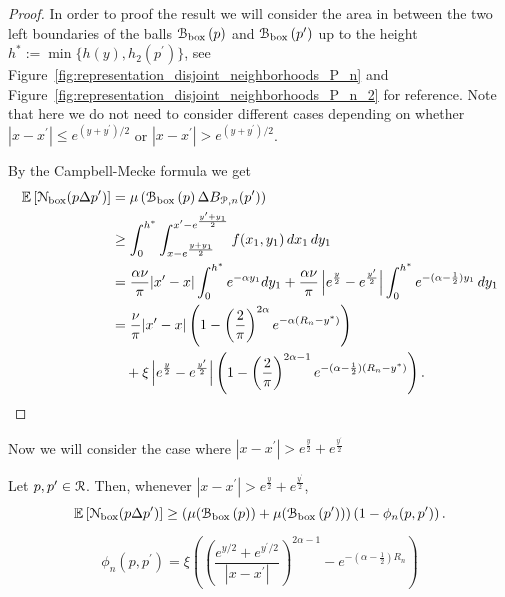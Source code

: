 \begin{proof}
In order to proof the result we will consider the area in between the two left boundaries of the balls ${\mathcal B}_{\text{box}}\left(p\right)$ and
${\mathcal B}_{\text{box}}\left(p^\prime\right)$ up to the height $h^\ast := \min\{h(y), h_2(p^\prime)\}$, see Figure~\ref{fig:representation_disjoint_neighborhoods_P_n} and Figure~\ref{fig:representation_disjoint_neighborhoods_P_n_2} for reference. Note that here we do not need to consider different cases depending on whether $|x - x^\prime| \le e^{(y + y^\prime)/2}$ or $|x - x^\prime| > e^{(y + y^\prime)/2}$. 

By the Campbell-Mecke formula we get
\begin{align*}
	\mathbb{E}\left[{\mathcal N}_{\text{box}}(p \Delta p^\prime)\right] &=	\mu\left({\mathcal B}_{\text{box}}\left(p\right) \Delta B_{{\mathcal P},n}(p^\prime)\right)\\
	&\ge \int_0^{h^\ast} \int_{x - e^{\frac{y + y_1}{2}}}^{x^\prime - e^{\frac{y^\prime + y_1}{2}}} f(x_1,y_1)
		\, dx_1 \, dy_1 \\
	&= \frac{\alpha \nu}{\pi}|x^\prime - x| \int_{0}^{h^\ast} e^{-\alpha y_1} dy_1
		+ \frac{\alpha \nu}{\pi}\left|e^{\frac{y}{2}} - e^{\frac{y^\prime}{2}}\right| \int_0^{h^\ast} 
		e^{-(\alpha-\frac{1}{2})y_1} \, dy_1\\
	&= \frac{\nu}{\pi}|x^\prime - x|\left(1 - \left(\frac{2}{\pi}\right)^{2\alpha}e^{-\alpha(R_n - y^\ast)}\right)\\
	&\hspace{10pt}+ \xi\left|e^{\frac{y}{2}} - e^{\frac{y^\prime}{2}}\right|
		\left(1 - \left(\frac{2}{\pi}\right)^{2\alpha - 1}e^{-(\alpha - \frac{1}{2})(R_n-y^\ast)}\right).
\end{align*}
\end{proof}

Now we will consider the case where $|x - x^\prime| > e^{\frac{y}{2}} + e^{\frac{y^\prime}{2}}$

\begin{lemma}\label{lem:disjoint_neighbors_P_n_large}
Let $p, p^\prime \in {\mathcal R}$. Then, whenever $|x - x^\prime| > e^{\frac{y}{2}} + e^{\frac{y^\prime}{2}}$,
\[
	\mathbb{E}\left[{\mathcal N}_{\text{box}}(p\Delta p^\prime)\right]
	\ge \left(\mu({\mathcal B}_{\text{box}}\left(p\right)) + \mu({\mathcal B}_{\text{box}}\left(p^\prime\right))\right)
		\left(1-\phi_n(p,p^\prime)\right).
\]

\[
	\phi_n(p,p^\prime) = \xi\left( \left(\frac{e^{y/2} + e^{y^\prime/2}}{|x-x^\prime|}\right)^{2\alpha - 1}
	- e^{-(\alpha - \frac{1}{2})R_n}\right)
\]
\end{lemma}

